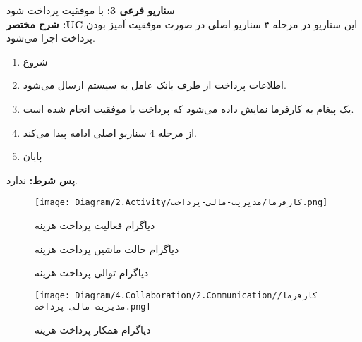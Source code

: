 \noindent
\textbf{سناريو فرعی 3:}
با موفقیت پرداخت ‌شود
\\
\textbf{شرح مختصر :UC}
این سناریو در مرحله ۴ سناریو اصلی در صورت موفقیت آمیز بودن پرداخت اجرا می‌شود.
\begin{enumerate}
\item
شروع
\item
اطلاعات پرداخت از طرف بانک عامل به سیستم ارسال می‌شود.
\item
یک پیغام به کارفرما نمایش داده می‌شود که پرداخت با موفقیت انجام شده است.
\item
از مرحله 4 سناریو اصلی ادامه پیدا می‌کند.
\item
پایان
\end{enumerate}

\noindent
\textbf{پس شرط:}
ندارد.




\begin{figure}[H]
	\centering
	\texttt{[image: Diagram/2.Activity/کارفرما/مدیریت-مالی-پرداخت.png]}
	\caption{دیاگرام فعالیت پرداخت هزینه}
	\label{fig:a:پرداخت-هزینه}
\end{figure}
\begin{figure}[H]
\centering
\caption{دیاگرام حالت ماشین پرداخت هزینه}
\label{fig:sm:پرداخت-هزینه}
\end{figure}
\begin{figure}[H]
	\centering
	\caption{دیاگرام توالی پرداخت هزینه}
	\label{fig:s:پرداخت-هزینه}
\end{figure}
\begin{figure}[H]
	\centering
	\texttt{[image: Diagram/4.Collaboration/2.Communication/کارفرما/مدیریت-مالی-پرداخت.png]}
	\caption{دیاگرام همکار پرداخت هزینه}
	\label{fig:c:پرداخت-هزینه}
\end{figure}

